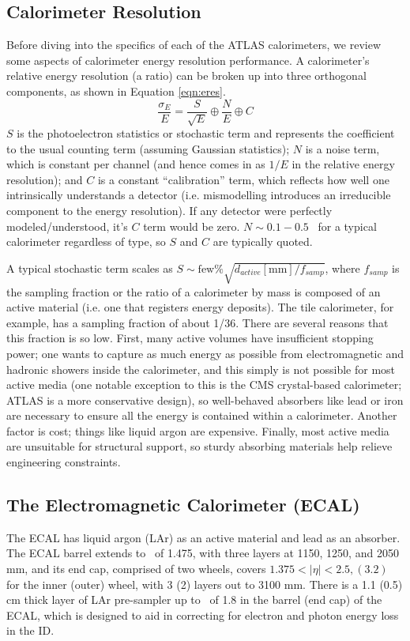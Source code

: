 \subsection{Calorimeter Resolution}
Before diving into the specifics of each of the ATLAS calorimeters, we review some aspects of calorimeter energy resolution performance.  A calorimeter's relative energy resolution (a ratio) can be broken up into three orthogonal components, as shown in Equation \ref{eqn:eres}.
\begin{equation}
\frac{\sigma_E}{E}=\frac{S}{\sqrt{E}}\oplus\frac{N}{E}\oplus C
\label{eqn:eres}
\end{equation}
$S$ is the photoelectron statistics or stochastic term and represents the coefficient to the usual counting term (assuming Gaussian statistics); $N$ is a noise term, which is constant per channel (and hence comes in as $1/E$ in the relative energy resolution); and $C$ is a constant ``calibration'' term, which reflects how well one intrinsically understands a detector (i.e. mismodelling introduces an irreducible component to the energy resolution).  If any detector were perfectly modeled/understood, it's $C$ term would be zero.  $N\sim0.1-0.5$ \GeV\, for a typical calorimeter regardless of type, so $S$ and $C$ are typically quoted.

A typical stochastic term scales as $S\sim \text{few}\%\sqrt{d_{active}\left[\text{mm}\right]/f_{samp}}$, where $f_{samp}$ is the sampling fraction or the ratio of a calorimeter by mass is composed of an active material (i.e. one that registers energy deposits).  The tile calorimeter, for example, has a sampling fraction of about 1/36.  There are several reasons that this fraction is so low.  First, many active volumes have insufficient stopping power; one wants to capture as much energy as possible from electromagnetic and hadronic showers inside the calorimeter, and this simply is not possible for most active media (one notable exception to this is the CMS crystal-based calorimeter; ATLAS is a more conservative design), so well-behaved absorbers like lead or iron are necessary to ensure all the energy is contained within a calorimeter.  Another factor is cost; things like liquid argon are expensive.  Finally, most active media are unsuitable for structural support, so sturdy absorbing materials help relieve engineering constraints.

\subsection{The Electromagnetic Calorimeter (ECAL)}
The ECAL has liquid argon (LAr) as an active material and lead as an absorber.  The ECAL barrel extends to \aeta\, of 1.475, with three layers at 1150, 1250, and 2050 mm, and its end cap, comprised of two wheels, covers $1.375<\left|\eta\right|<2.5,\left(3.2\right)$  for the inner (outer) wheel, with 3 (2) layers out to 3100 mm.  There is a 1.1 (0.5) cm thick layer of LAr pre-sampler up to \aeta\, of 1.8 in the barrel (end cap) of the ECAL, which is designed to aid in correcting for electron and photon energy loss in the ID.

